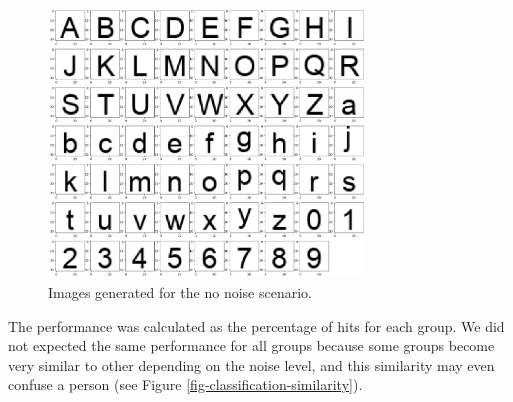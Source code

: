 \begin{figure}[!htb]
\centering\includegraphics[width=0.75\textwidth]{./images02/classification/no-noise.png}
\caption{Images generated for the no noise scenario.
\label{fig-classification-no-noise}}
\end{figure}

The performance was calculated as the percentage of hits for each group. We did not expected the same performance for all groups because some groups become very similar to other depending on the noise level, and this similarity may even confuse a person (see Figure \ref{fig-classification-similarity}).

